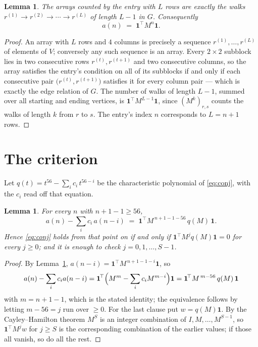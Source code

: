 \documentclass[11pt,a4paper]{article}
\theoremstyle{plain}
\newtheorem{lemma}[theorem]{Lemma}
\theoremstyle{definition}
\begin{document}
\begin{lemma}\label{lem:walk}
The arrays counted by the entry with $L$ rows are exactly the walks
$r^{(1)}\to r^{(2)}\to\cdots\to r^{(L)}$ of length $L-1$ in $G$. Consequently
\[
a(n)\;=\;\mathbf{1}^{\!\top}M^{n}\mathbf{1} .
\]
\end{lemma}

\begin{proof}
An array with $L$ rows and $4$ columns is precisely a sequence
$r^{(1)},\dots,r^{(L)}$ of elements of $V$; conversely any such sequence is an array.
Every $2\times2$ subblock lies in two consecutive rows $r^{(t)},r^{(t+1)}$ and two
consecutive columns, so the array satisfies the entry's condition on all of its subblocks
if and only if each consecutive pair $\bigl(r^{(t)},r^{(t+1)}\bigr)$ satisfies it for
every column pair --- which is exactly the edge relation of $G$. The number of walks of
length $L-1$, summed over all starting and ending vertices, is
$\mathbf{1}^{\!\top}M^{L-1}\mathbf{1}$, since $(M^{k})_{r,s}$ counts the walks of
length $k$ from $r$ to $s$. The entry's index $n$ corresponds to $L=n+1$ rows.
\end{proof}

\section{The criterion}

Let $q(t)=t^{56}-\sum_i c_i\,t^{56-i}$ be the characteristic polynomial of
\eqref{eq:conj}, with the $c_i$ read off that equation.

\begin{lemma}\label{lem:crit}
For every $n$ with $n+1-1\ge56$,
\[
a(n)-\sum_i c_i\,a(n-i)\;=\;\mathbf{1}^{\!\top}M^{\,n+1-1-56}\,q(M)\,\mathbf{1} .
\]
Hence \eqref{eq:conj} holds from that point on if and only if
$\mathbf{1}^{\!\top}M^{j}q(M)\mathbf{1}=0$ for every $j\ge0$; and it is enough to check
$j=0,1,\dots,S-1$.
\end{lemma}

\begin{proof}
By Lemma~\ref{lem:walk}, $a(n-i)=\mathbf{1}^{\!\top}M^{\,n+1-1-i}\mathbf{1}$, so
\[
a(n)-\sum_i c_i a(n-i)
=\mathbf{1}^{\!\top}\Bigl(M^{m}-\sum_i c_i M^{m-i}\Bigr)\mathbf{1}
=\mathbf{1}^{\!\top}M^{\,m-56}\,q(M)\,\mathbf{1}
\]
with $m=n+1-1$, which is the stated identity; the equivalence follows by letting
$m-56=j$ run over $\ge0$. For the last clause put $w=q(M)\mathbf{1}$. By the
Cayley--Hamilton theorem $M^{S}$ is an integer combination of $I,M,\dots,M^{S-1}$, so
$\mathbf{1}^{\!\top}M^{j}w$ for $j\ge S$ is the corresponding combination of the earlier
values; if those all vanish, so do all the rest.
\end{proof}
\end{document}
